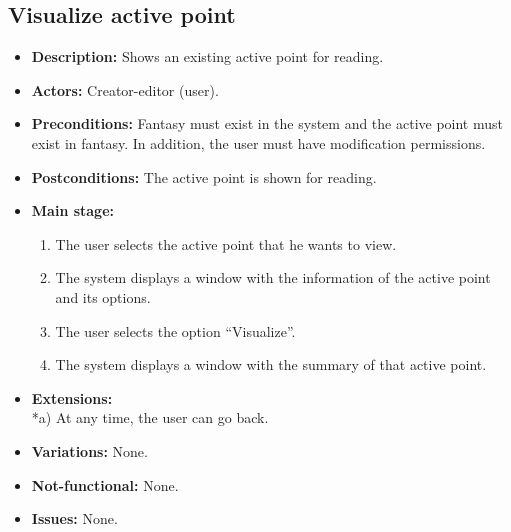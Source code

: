 \subsection{Visualize active point}
\begin{itemize}
	\item \textbf{Description:} Shows an existing active point for reading.
	\item \textbf{Actors:} Creator-editor (user).
	\item \textbf{Preconditions:} Fantasy must exist in the system and the active point must exist in fantasy. In addition, the user must have modification permissions.
	\item \textbf{Postconditions:} The active point is shown for reading.
	\item \textbf{Main stage:}
	\begin{enumerate}
		\item The user selects the active point that he wants to view.
		\item The system displays a window with the information of the active point and its options.
		\item The user selects the option ``Visualize''.
		\item The system displays a window with the summary of that active point.
	\end{enumerate}
	\item \textbf{Extensions:} \\ *a) At any time, the user can go back.
	\item \textbf{Variations:} None.
	\item \textbf{Not-functional:} None.
	\item \textbf{Issues:} None.
\end{itemize}

